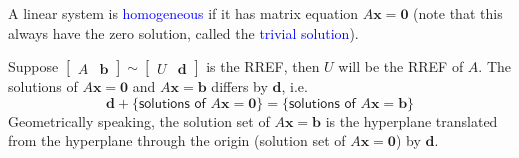 \documentclass{beamer}
\theoremstyle{definition}
\theoremstyle{remark}
\begin{document}
\begin{frame}[t]
\begin{definition}
A linear system is \textcolor{blue}{homogeneous} if it has matrix equation $A\mathbf x=\mathbf 0$ (note that this always have the zero solution, called the \textcolor{blue}{trivial solution}).
\end{definition}
\pause
\begin{theorem}
Suppose $\begin{bmatrix}
A&\mathbf b
\end{bmatrix}\sim\begin{bmatrix}
U&\mathbf d
\end{bmatrix}$ is the RREF, then $U$ will be the RREF of $A$. The solutions of $A\mathbf x=\mathbf0$ and $A\mathbf x=\mathbf b$ differs by $\mathbf d$, i.e.
\[
\mathbf d+\{\textsf{solutions of }A\mathbf x=\mathbf0\}=\{\textsf{solutions of }A\mathbf x=\mathbf b\}
\]\pause
Geometrically speaking, the solution set of $A\mathbf x=\mathbf b$ is the hyperplane translated from the hyperplane through the origin (solution set of $A\mathbf x=\mathbf0$) by $\mathbf d$.
\end{theorem}
\end{frame}
\end{document}
